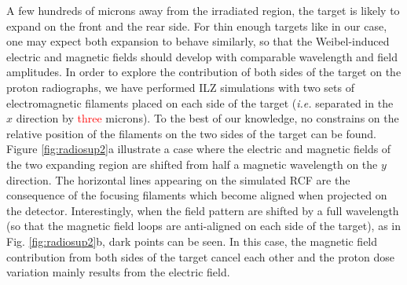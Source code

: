\documentclass[aps,showpacs,superscriptaddress]{revtex4}
\begin{document}
A few hundreds of microns away from the irradiated region, the target is likely to expand on the front and the rear side. 
For thin enough targets like in our case, one may expect both expansion to behave similarly, so that the  Weibel-induced electric and magnetic fields should develop with comparable wavelength and field amplitudes. 
In order to explore the contribution of both  sides of the target on the proton radiographs, we have performed ILZ simulations with two  sets of electromagnetic filaments placed on each side of the target (\emph{i.e.} separated in the $x$ direction by \textcolor{red}{three} microns).
To the best of our knowledge, no constrains on the relative position of the filaments on the two sides of the target can be found. 
Figure \ref{fig:radiosup2}a illustrate a case where the electric and magnetic fields of the two expanding region are shifted from half a magnetic wavelength on the $y$ direction. The horizontal lines appearing on the simulated RCF are the consequence of the focusing filaments which become aligned when projected on the detector.
Interestingly, when the field pattern are shifted by a full wavelength (so that the magnetic field loops are anti-aligned on each side of the target), as in Fig. \ref{fig:radiosup2}b, dark points can be seen. In this case, the magnetic field contribution from both sides of the target cancel each other and the proton dose variation mainly results from the electric field. 
\end{document}
